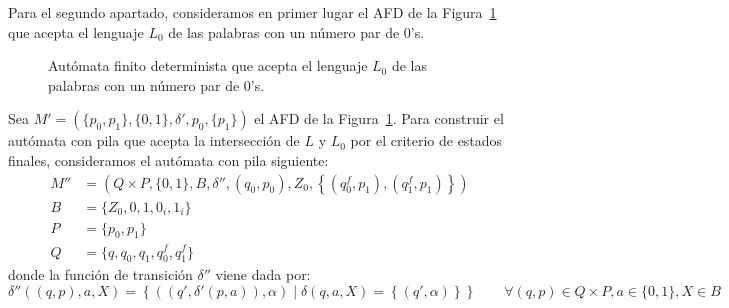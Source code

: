 \documentclass[12pt]{article}
\begin{document}
\begin{ejercicio}[2.5 puntos]
        Para el segundo apartado, consideramos en primer lugar el AFD de la Figura~\ref{fig:AFD} que acepta el lenguaje $L_0$ de las palabras con un número par de $0$'s.
        \begin{figure}[h]
            \centering
            \caption{\centering Autómata finito determinista que acepta el lenguaje $L_0$ de las palabras con un número par de $0$'s.}
            \label{fig:AFD}
        \end{figure}

        Sea $M'=(\{p_0,p_1\},\{0,1\},\delta',p_0,\{p_1\})$ el AFD de la Figura~\ref{fig:AFD}. Para construir el autómata con pila que acepta la intersección de $L$ y $L_0$ por el criterio de estados finales, consideramos el autómata con pila siguiente:
        \begin{align*}
            M''&=\left(Q\times P,\{0,1\},B,\delta'',(q_0,p_0),Z_0,\left\{\left(q_0^f,p_1\right),\left(q_1^f,p_1\right)\right\}\right) \\
            B&=\{Z_0,0,1,0_i,1_i\} \\
            P&=\{p_0,p_1\} \\
            Q&=\{q,q_0,q_1,q_0^f,q_1^f\}
        \end{align*}
        donde la función de transición $\delta''$ viene dada por:
        \begin{equation*}
            \delta''((q,p),a,X)=\left\{\left((q',\delta'(p,a)),\alpha\right) \mid \delta(q,a,X)=\left\{(q',\alpha)\right\}\right\} \qquad \forall (q,p)\in Q\times P,a\in \{0,1\},X\in B
        \end{equation*}
    \end{ejercicio}
\end{document}
